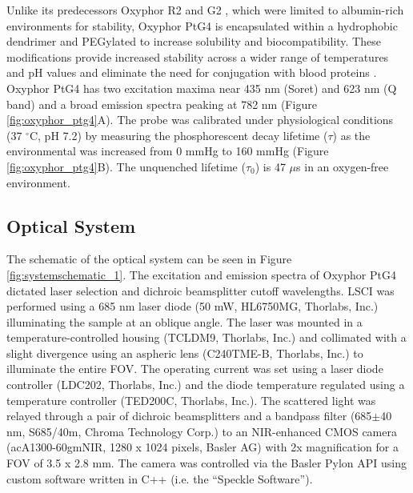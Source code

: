 Unlike its predecessors Oxyphor R2 and G2 \cite{Dunphy:2002tz}, which were limited to albumin-rich environments for stability, Oxyphor PtG4 is encapsulated within a hydrophobic dendrimer and PEGylated to increase solubility and biocompatibility. These modifications provide increased stability across a wider range of temperatures and pH values and eliminate the need for conjugation with blood proteins \cite{Esipova:2011hi}. Oxyphor PtG4 has two excitation maxima near 435 nm (Soret) and 623 nm (Q band) and a broad emission spectra peaking at 782 nm (Figure \ref{fig:oxyphor_ptg4}A). The probe was calibrated under physiological conditions (37 $^\circ$C, pH 7.2) by measuring the phosphorescent decay lifetime ($\tau$) as the environmental  was increased from 0 mmHg to 160 mmHg (Figure \ref{fig:oxyphor_ptg4}B). The unquenched lifetime ($\tau_0$) is 47 $\mu$s in an oxygen-free environment.

\subsection{Optical System}

The schematic of the optical system can be seen in Figure \ref{fig:systemschematic_1}. The excitation and emission spectra of Oxyphor PtG4 dictated laser selection and dichroic beamsplitter cutoff wavelengths. LSCI was performed using a 685 nm laser diode (50 mW, HL6750MG, Thorlabs, Inc.) illuminating the sample at an oblique angle. The laser was mounted in a temperature-controlled housing (TCLDM9, Thorlabs, Inc.) and collimated with a slight divergence using an aspheric lens (C240TME-B, Thorlabs, Inc.) to illuminate the entire FOV. The operating current was set using a laser diode controller (LDC202, Thorlabs, Inc.) and the diode temperature regulated using a temperature controller (TED200C, Thorlabs, Inc.). The scattered light was relayed through a pair of dichroic beamsplitters and a bandpass filter (685$\pm$40 nm, S685/40m, Chroma Technology Corp.) to an NIR-enhanced CMOS camera (acA1300-60gmNIR, 1280 x 1024 pixels, Basler AG) with 2x magnification for a FOV of 3.5 x 2.8 mm. The camera was controlled via the Basler Pylon API using custom software written in C++ (i.e. the ``Speckle Software'').


